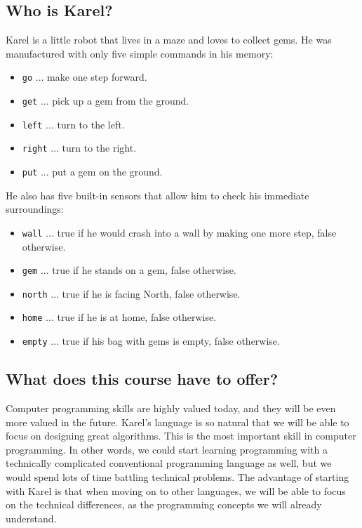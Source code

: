 \documentclass[article,A4,12pt]{llncs}
\begin{document}
\subsection{Who is Karel?}

Karel is a little robot that lives in a maze and loves to collect gems.
He was manufactured with only five simple commands in his memory:
\begin{itemize}
\item {\color{blue} \tt go} ... make one step forward.
\item {\color{blue} \tt get} ... pick up a gem from the ground. 
\item {\color{blue} \tt left} ... turn to the left.
\item {\color{blue} \tt right} ... turn to the right. 
\item {\color{blue} \tt put} ... put a gem on the ground. 
\end{itemize}
He also has five built-in sensors that allow him to check his immediate surroundings:
\begin{itemize}
\item {\color{ForestGreen} \tt wall} ... true if he would crash into a wall by making one more step, false otherwise. 
\item {\color{ForestGreen} \tt gem} ... true if he stands on a gem, false otherwise.
\item {\color{ForestGreen} \tt north} ... true if he is facing North, false otherwise.
\item {\color{ForestGreen} \tt home} ... true if he is at home, false otherwise.
\item {\color{ForestGreen} \tt empty} ... true if his bag with gems is empty, false otherwise. 
\end{itemize}

\subsection{What does this course have to offer?}

Computer programming skills are highly valued today, and they will be even more 
valued in the future. Karel's language is so natural that we will be able to 
focus on designing great algorithms. This is the most important skill in 
computer programming. In other words, we could start learning programming 
with a technically 
complicated conventional programming language as well, but we would spend lots of time 
battling technical problems. The advantage of starting with Karel is that 
when moving on to other languages, we will be able to focus on the technical 
differences, as the programming concepts we will already understand.
\end{document}
